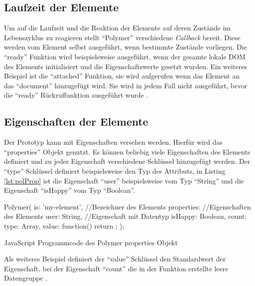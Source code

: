 \documentclass[12pt, paper=a4, bibtotoc, toc=listof, headsepline=true, numbers=endperiod]{scrreprt}
\begin{document}
\subsection{Laufzeit der Elemente}
\label{sec:polLau}
Um auf die Laufzeit und die Reaktion der Elemente auf deren Zustände im Lebenszyklus zu reagieren stellt \enquote{Polymer} verschiedene \emph{Callback} bereit. Diese werden vom Element selbst ausgeführt, wenn bestimmte Zustände vorliegen. Die \enquote{ready} Funktion wird beispielsweise ausgeführt, wenn der gesamte lokale \ac{DOM} des Elements initialisiert und die Eigenschaftswerte gesetzt wurden. Ein weiteres Beispiel ist die \enquote{attached} Funktion, sie wird aufgerufen wenn das Element an das \enquote{document} hinzugefügt wird. Sie wird in jedem Fall nicht ausgeführt, bevor die \enquote{ready} Rückruffunktion ausgeführt wurde \cite{polyReg}.
\subsection{Eigenschaften der Elemente}
Der Prototyp kann mit Eigenschaften versehen werden. Hierfür wird das \enquote{properties} Objekt genutzt. Es können beliebig viele Eigenschaften des Elements definiert und zu jeder Eigenschaft verschiedene Schlüssel hinzugefügt werden. Der \enquote{type} Schlüssel definiert beispielsweise den Typ des Attributs, in Listing \ref{lst:polProp} ist die Eigenschaft \enquote{user} beispielsweise vom Typ \enquote{String} und die Eigenschaft \enquote{isHappy} vom Typ \enquote{Boolean}.
\begin{listing}[H]
	\begin{JavaScriptcode*}{}
Polymer({
   is: 'my-element', //Bezeichner des Elements
   properties: {  //Eigenschaften des Elements
      user: String, //Eigenschaft mit Datentyp
      isHappy: Boolean,
      count: {
         type: Array,
         value: function() { return {}; }
      }
   }
});
	\end{JavaScriptcode*}
	\caption[Polymer properties Objekt]{JavaScript Programmcode des Polymer properties Objekt}
	\label{lst:polProp}
\end{listing}\noindent
Als weiteres Beispiel definiert der \enquote{value} Schlüssel den Standardwert der Eigenschaft, bei der Eigenschaft \enquote{count} die in der Funktion erstellte leere Datengruppe \cite{polyProp}.
\end{document}
